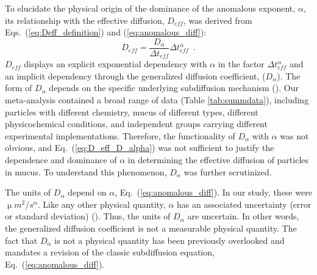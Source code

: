 \documentclass[aps,prl,preprint,superscriptaddress,showkeys,linenumbers]{revtex4-1}
\begin{document}
To elucidate the physical origin of the dominance of the anomalous exponent, $\alpha$, its relationship with the effective diffusion, $D_{eff}$, was derived from Eqs.~(\ref{eq:Deff_definition}) and (\ref{eq:anomalous_diff}):
\begin{equation}
D_{eff} =   \frac{D_{\alpha}}{\Delta t_{eff}} \Delta t_{eff}^{\alpha} \,\,\, .
\label{eq:D_eff_D_alpha}
\end{equation}
$D_{eff}$ displays an explicit exponential dependency with $\alpha$ in the factor $\Delta t_{eff}^{\alpha}$ and an implicit dependency through the generalized diffusion coefficient, ($D_{\alpha}$). The form of $D_{\alpha}$ depends on the specific underlying subdiffusion mechanism (\cite{Metzler2014,Kevin_2019}). Our meta-analysis contained a broad range of data (Table \ref{tab:summdata}), including particles with different chemistry, mucus of different types, different physicochemical conditions, and independent groups carrying different experimental implementations. Therefore, the functionality of $D_{\alpha}$ with $\alpha$ was not obvious, and Eq.~(\ref{eq:D_eff_D_alpha}) was not sufficient to justify the dependence and dominance of $\alpha$ in determining the effective diffusion of particles in mucus. To understand this phenomenon, $D_{\alpha}$ was further scrutinized.

The units of $D_{\alpha}$ depend on $\alpha$, Eq.~(\ref{eq:anomalous_diff}). In our study, these were $\upmu m^2/s^{\alpha}$. Like any other physical quantity, $\alpha$ has an associated uncertainty (error or standard deviation) (\cite{Taylor1997book}). Thus, the units of $D_{\alpha}$ are uncertain. In other words, the generalized diffusion coefficient is not a measurable physical quantity. The fact that $D_{\alpha}$ is not a physical quantity has been previously overlooked and mandates a revision of the classic subdiffusion equation, Eq.~(\ref{eq:anomalous_diff}).
\end{document}
